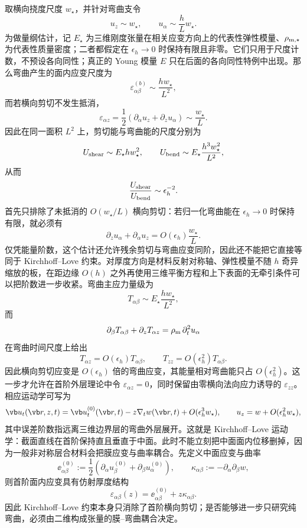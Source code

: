 取横向挠度尺度 \(w_\star\)，并针对弯曲支令
\[
 u_z\sim w_\star,
 \qquad
 u_\alpha\sim \frac{h}{L}w_\star.
\]
为做量纲估计，记 \(E_\star\) 为三维刚度张量在相关应变方向上的代表性弹性模量、\(\rho_{{\rm m},\star}\) 为代表性质量密度；二者都假定在 \(\epsilon_h\to0\) 时保持有限且非零。它们只用于尺度计数，不预设各向同性；真正的 Young 模量 \(E\) 只在后面的各向同性特例中出现。那么弯曲产生的面内应变尺度为
\[
 \varepsilon_{\alpha\beta}^{(b)}
 \sim \frac{h w_\star}{L^2},
\]
而若横向剪切不发生抵消，
\[
 \varepsilon_{\alpha z}
 =\frac12(\partial_\alpha u_z+\partial_z u_\alpha)
 \sim \frac{w_\star}{L}.
\]
因此在同一面积 \(L^2\) 上，剪切能与弯曲能的尺度分别为
\[
 U_{\rm shear}\sim E_\star h w_\star^2,
 \qquad
 U_{\rm bend}\sim E_\star\frac{h^3w_\star^2}{L^2},
\]
从而
\begin{equation}
 \frac{U_{\rm shear}}{U_{\rm bend}}
 \sim\epsilon_h^{-2}.
 \label{eq:phys-cont-kl-shear-scaling}
\end{equation}
 首先只排除了未抵消的 \(O(w_\star/L)\) 横向剪切：若归一化弯曲能在 \(\epsilon_h\to0\) 时保持有限，就必须有
\[
 \partial_z u_\alpha+\partial_\alpha u_z
 =O(\epsilon_h)\frac{w_\star}{L}.
\]
仅凭能量阶数，这个估计还允许残余剪切与弯曲应变同阶，因此还不能把它直接等同于 Kirchhoff--Love 约束。对厚度方向是材料反射对称轴、弹性模量不随 \(h\) 奇异缩放的板，在距边缘 \(O(h)\) 之外再使用三维平衡方程和上下表面的无牵引条件可以把阶数进一步收紧。弯曲主应力量级为
\[
 T_{\alpha\beta}\sim E_\star\frac{hw_\star}{L^2},
\]
而
\[
 \partial_\beta T_{\alpha\beta}+\partial_zT_{\alpha z}
 =\rho_{\rm m}\,\partial_t^2u_\alpha
\]
在弯曲时间尺度上给出
\[
 T_{\alpha z}=O(\epsilon_h)T_{\alpha\beta},
 \qquad
 T_{zz}=O(\epsilon_h^2)T_{\alpha\beta}.
\]
因此横向剪切应变是 \(O(\epsilon_h)\) 倍的弯曲应变，其能量相对弯曲能只占 \(O(\epsilon_h^2)\)。这一步才允许在首阶外层理论中令 \(\varepsilon_{\alpha z}=0\)，同时保留由零横向法向应力诱导的 \(\varepsilon_{zz}\)。相应运动学可写为
\begin{equation}
 \vb u_t(\vb r,z,t)
 =\vb u_t^{(0)}(\vb r,t)-z\nabla_t w(\vb r,t)
 +O(\epsilon_h^3w_\star),
 \qquad
 u_z=w+O(\epsilon_h^2w_\star),
 \label{eq:phys-cont-kl-kinematics}
\end{equation}
其中误差阶数指远离三维边界层的弯曲外层展开。这就是 Kirchhoff--Love 运动学：截面直线在首阶保持直且垂直于中面。此时不能立刻把中面面内位移删掉，因为一般非对称层合材料会把膜应变与曲率耦合。先定义中面应变与曲率
\begin{equation}
 \ee^{(0)}_{\alpha\beta}
 :=\frac12(\partial_\alpha u^{(0)}_\beta+\partial_\beta u^{(0)}_\alpha),
 \qquad
 \kappa_{\alpha\beta}:=-\partial_\alpha\partial_\beta w,
 \label{eq:phys-cont-kl-strain}
\end{equation}
则首阶面内应变具有仿射厚度结构
\[
 \varepsilon_{\alpha\beta}(z)
 =\ee^{(0)}_{\alpha\beta}+z\kappa_{\alpha\beta}.
\]
因此 Kirchhoff--Love 约束本身只消除了首阶横向剪切；是否能够进一步只研究纯弯曲，必须由二维构成张量的膜--弯曲耦合决定。

